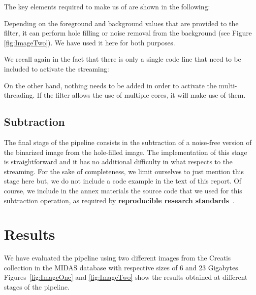 \documentclass{InsightArticle}
\begin{document}
The key elements required to make us of  
are shown in the following:

\begin{center}

\end{center}

Depending on the foreground and background values that are provided to the
filter, it can perform hole filling or noise removal from the background (see
Figure \ref{fig:ImageTwo}).  We have used it here for both purposes.

We recall again in the fact that there is only a single code line that
need to be included to activate the streaming:

\begin{center}

\end{center}

On the other hand, nothing needs to be added in order to activate the multi-threading.
If the filter allows the use of multiple cores, it will make use of them.

\subsection{Subtraction}
The final stage of the pipeline consists in the subtraction of  a noise-free
version of the binarized image from the hole-filled image. The implementation
of this stage is straightforward and it has no additional difficulty in what
respects to the streaming. For the sake of completeness, we limit ourselves to
just mention this stage here but, we do not include a code example in the text
of this report.  Of course, we include in the annex materials the source code
that we used for this subtraction operation, as required by
\textbf{reproducible research standards}~\cite{Stodden2009}.

\section{Results}
We have evaluated the pipeline using two different images from the Creatis collection
in the MIDAS database\cite{Zuluaga2011a} with respective sizes of 6 and 23 Gigabytes.
Figures~\ref{fig:ImageOne} and \ref{fig:ImageTwo} show the results obtained at different
stages of the pipeline.
\end{document}
